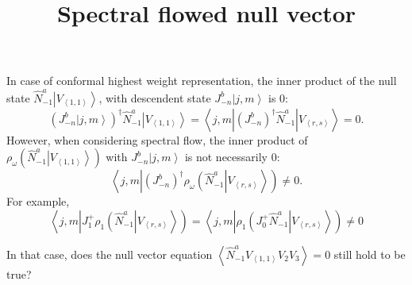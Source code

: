 \documentclass[10pt,a4paper]{article}
\numberwithin{equation}{section}
\newcommand{\ket}[1]{\left| #1 \right\rangle}
\newcommand{\vev}[1]{\left\langle #1 \right\rangle}
\begin{document}
\title{Spectral flowed null vector}
\maketitle

In case of conformal highest weight representation, the inner product of the null state $\hat{N}^{a}_{-1}\ket{V_{\vev{1,1}}}$, 
with descendent state $J^{b}_{-n} \ket{j,m}$ is 0:
\begin{equation}
    \left(J^{b}_{-n} \ket{j,m}\right)^{\dagger} \hat{N}^{a}_{-1}\ket{V_{\vev{1,1}}} = \left\langle j,m \left| \left(J^{b}_{-n}\right)^{\dagger} \hat{N}^{a}_{-1} \right| V_{\vev{r,s}}  \right\rangle = 0.
\end{equation}
However, when considering spectral flow, the inner product of $\rho_{\omega} (\hat{N}^{a}_{-1}\ket{V_{\vev{1,1}}})$ with $J^{b}_{-n} \ket{j,m}$ 
is not necessarily 0:
\begin{equation}
    \left\langle j,m \left|  \left(J^{b}_{-n}\right)^{\dagger} \rho_{\omega}\left(\hat{N}^{a}_{-1} \right| V_{\vev{r,s}}  \right\rangle \right) \neq 0.
\end{equation}
For example, 
\begin{equation}
    \left\langle j,m \left|  J^{+}_{1} \rho_{1}\left(\hat{N}^{a}_{-1} \right| V_{\vev{r,s}}  \right\rangle \right) = \left\langle j,m \left| \rho_{1}\left(J^{+}_{0} \hat{N}^{a}_{-1} \right| V_{\vev{r,s}}  \right\rangle \right) \neq 0
\end{equation}

In that case, does the null vector equation $\vev{\hat{N}^{a}_{-1} V_{\vev{1,1}} V_{2} V_{3}} = 0$ still hold to be true? 
\end{document}
